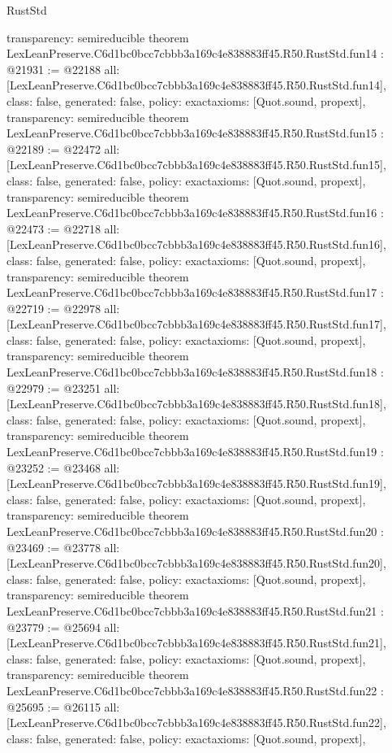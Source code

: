 \begin{lexlean}{RustStd}
\begin{coremodule}
{  transparency: semireducible
}
theorem LexLeanPreserve.C6d1bc0bcc7cbbb3a169c4e838883ff45.R50.RustStd.fun14 : @21931 := @22188 {
  all: [LexLeanPreserve.C6d1bc0bcc7cbbb3a169c4e838883ff45.R50.RustStd.fun14],
  class: false,
  generated: false,
  policy: exact{axioms: [Quot.sound, propext]},
  transparency: semireducible
}
theorem LexLeanPreserve.C6d1bc0bcc7cbbb3a169c4e838883ff45.R50.RustStd.fun15 : @22189 := @22472 {
  all: [LexLeanPreserve.C6d1bc0bcc7cbbb3a169c4e838883ff45.R50.RustStd.fun15],
  class: false,
  generated: false,
  policy: exact{axioms: [Quot.sound, propext]},
  transparency: semireducible
}
theorem LexLeanPreserve.C6d1bc0bcc7cbbb3a169c4e838883ff45.R50.RustStd.fun16 : @22473 := @22718 {
  all: [LexLeanPreserve.C6d1bc0bcc7cbbb3a169c4e838883ff45.R50.RustStd.fun16],
  class: false,
  generated: false,
  policy: exact{axioms: [Quot.sound, propext]},
  transparency: semireducible
}
theorem LexLeanPreserve.C6d1bc0bcc7cbbb3a169c4e838883ff45.R50.RustStd.fun17 : @22719 := @22978 {
  all: [LexLeanPreserve.C6d1bc0bcc7cbbb3a169c4e838883ff45.R50.RustStd.fun17],
  class: false,
  generated: false,
  policy: exact{axioms: [Quot.sound, propext]},
  transparency: semireducible
}
theorem LexLeanPreserve.C6d1bc0bcc7cbbb3a169c4e838883ff45.R50.RustStd.fun18 : @22979 := @23251 {
  all: [LexLeanPreserve.C6d1bc0bcc7cbbb3a169c4e838883ff45.R50.RustStd.fun18],
  class: false,
  generated: false,
  policy: exact{axioms: [Quot.sound, propext]},
  transparency: semireducible
}
theorem LexLeanPreserve.C6d1bc0bcc7cbbb3a169c4e838883ff45.R50.RustStd.fun19 : @23252 := @23468 {
  all: [LexLeanPreserve.C6d1bc0bcc7cbbb3a169c4e838883ff45.R50.RustStd.fun19],
  class: false,
  generated: false,
  policy: exact{axioms: [Quot.sound, propext]},
  transparency: semireducible
}
theorem LexLeanPreserve.C6d1bc0bcc7cbbb3a169c4e838883ff45.R50.RustStd.fun20 : @23469 := @23778 {
  all: [LexLeanPreserve.C6d1bc0bcc7cbbb3a169c4e838883ff45.R50.RustStd.fun20],
  class: false,
  generated: false,
  policy: exact{axioms: [Quot.sound, propext]},
  transparency: semireducible
}
theorem LexLeanPreserve.C6d1bc0bcc7cbbb3a169c4e838883ff45.R50.RustStd.fun21 : @23779 := @25694 {
  all: [LexLeanPreserve.C6d1bc0bcc7cbbb3a169c4e838883ff45.R50.RustStd.fun21],
  class: false,
  generated: false,
  policy: exact{axioms: [Quot.sound, propext]},
  transparency: semireducible
}
theorem LexLeanPreserve.C6d1bc0bcc7cbbb3a169c4e838883ff45.R50.RustStd.fun22 : @25695 := @26115 {
  all: [LexLeanPreserve.C6d1bc0bcc7cbbb3a169c4e838883ff45.R50.RustStd.fun22],
  class: false,
  generated: false,
  policy: exact{axioms: [Quot.sound, propext]},
}
\end{coremodule}
\end{lexlean}
